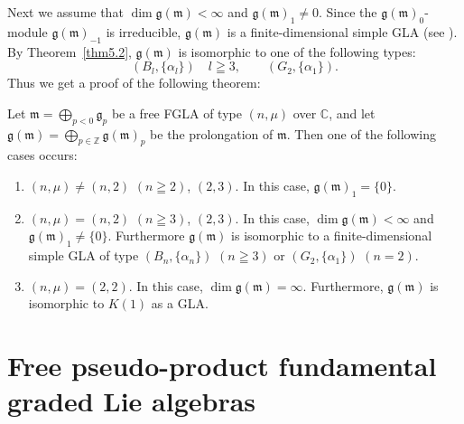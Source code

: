 \documentclass[pdftex]{sigma}
\numberwithin{equation}{section}
\numberwithin{theorem}{section}
\numberwithin{proposition}{section}
\numberwithin{lemma}{section}
\numberwithin{corollary}{section}
\numberwithin{definition}{section}
\numberwithin{example}{section}
\numberwithin{remark}{section}
\numberwithin{note}{section}
\newcommand{\gla}[1]{\mathfrak#1=\bigoplus\limits_{p\in\mathbb Z}\mathfrak#1_p} \renewcommand{\labelenumi}{{\rm (\arabic{enumi})}}
\begin{document}
Next we assume that $\dim \mathfrak g(\mathfrak m)<\infty$
and $\mathfrak g(\mathfrak m)_1\ne0$.
Since the $\mathfrak g(\mathfrak m)_0$-module $\mathfrak g(\mathfrak m)_{-1}$
is irreducible,
$\mathfrak g(\mathfrak m)$ is a f\/inite-dimensional simple GLA (see \cite{kn64:1,och70:1}).
By Theorem~\ref{thm5.2}, $\mathfrak g(\mathfrak m)$ is isomorphic to one of the following types:
\[
(B_l,\{\alpha_l\})\quad l\geqq3,\qquad (G_2,\{\alpha_1\}).
\]
Thus we get a proof of the following theorem:
\begin{theorem}\label{thm7.1}
Let $\mathfrak m=\bigoplus\limits_{p<0}\mathfrak g_p$ be a free FGLA of type
$(n,\mu)$ over $\mathbb C$, and let $\gla{g (\mathfrak m)}$ be
the prolongation of $\mathfrak m$.
Then one of the following cases occurs:
\begin{enumerate}\itemsep=0pt
\renewcommand{\labelenumi}{$(\alph{enumi})$}
\item $(n,\mu)\ne(n,2)$ $(n\geqq2)$, $(2,3)$. In this case,
$\mathfrak g(\mathfrak m)_1=\{0\}$.
\item
$(n,\mu)=
(n,2)$ $(n\geqq3)$, $(2,3)$.
In this case, $\dim\mathfrak g(\mathfrak m)<\infty$ and
$\mathfrak g(\mathfrak m)_1\ne\{0\}$. Furthermore
$\mathfrak g(\mathfrak m)$ is isomorphic to a finite-dimensional simple GLA of
type $(B_n,\{\alpha_n\})$ $(n\geqq3)$ or $(G_2,\{\alpha_1\})$ $(n=2)$.
\item $(n,\mu)=(2,2)$.
In this case,
$\dim\mathfrak g(\mathfrak m)=\infty$. Furthermore,
$\mathfrak g(\mathfrak m)$ is isomorphic to $K(1)$ as a GLA.
\end{enumerate}
\end{theorem}

\section{Free pseudo-product fundamental graded Lie algebras}\label{section8}
\end{document}
